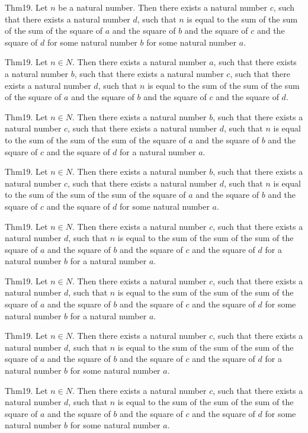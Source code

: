 \documentclass{article}
\begin{document}
Thm19. Let $n$ be a natural number. Then there exists a natural number $c$, such that there exists a natural number $d$, such that $n$ is equal to the sum of the sum of the sum of the square of $a$ and the square of $b$ and the square of $c$ and the square of $d$ for some natural number $b$ for some natural number $a$.

Thm19. Let $n \in N$. Then there exists a natural number $a$, such that there exists a natural number $b$, such that there exists a natural number $c$, such that there exists a natural number $d$, such that $n$ is equal to the sum of the sum of the sum of the square of $a$ and the square of $b$ and the square of $c$ and the square of $d$.

Thm19. Let $n \in N$. Then there exists a natural number $b$, such that there exists a natural number $c$, such that there exists a natural number $d$, such that $n$ is equal to the sum of the sum of the sum of the square of $a$ and the square of $b$ and the square of $c$ and the square of $d$ for a natural number $a$.

Thm19. Let $n \in N$. Then there exists a natural number $b$, such that there exists a natural number $c$, such that there exists a natural number $d$, such that $n$ is equal to the sum of the sum of the sum of the square of $a$ and the square of $b$ and the square of $c$ and the square of $d$ for some natural number $a$.

Thm19. Let $n \in N$. Then there exists a natural number $c$, such that there exists a natural number $d$, such that $n$ is equal to the sum of the sum of the sum of the square of $a$ and the square of $b$ and the square of $c$ and the square of $d$ for a natural number $b$ for a natural number $a$.

Thm19. Let $n \in N$. Then there exists a natural number $c$, such that there exists a natural number $d$, such that $n$ is equal to the sum of the sum of the sum of the square of $a$ and the square of $b$ and the square of $c$ and the square of $d$ for some natural number $b$ for a natural number $a$.

Thm19. Let $n \in N$. Then there exists a natural number $c$, such that there exists a natural number $d$, such that $n$ is equal to the sum of the sum of the sum of the square of $a$ and the square of $b$ and the square of $c$ and the square of $d$ for a natural number $b$ for some natural number $a$.

Thm19. Let $n \in N$. Then there exists a natural number $c$, such that there exists a natural number $d$, such that $n$ is equal to the sum of the sum of the sum of the square of $a$ and the square of $b$ and the square of $c$ and the square of $d$ for some natural number $b$ for some natural number $a$.
\end{document}
